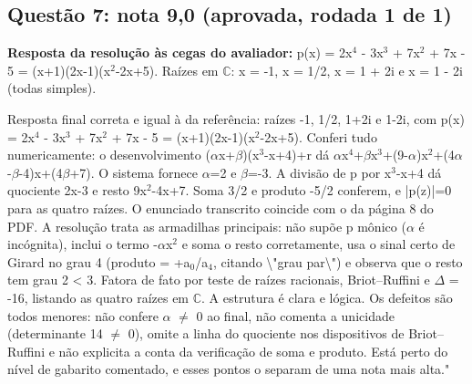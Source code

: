 \documentclass{article}%
\begin{document}
\subsection*{Questão 7: nota 9,0 (aprovada, rodada 1 de 1)}%
\textbf{Resposta da resolução às cegas do avaliador:} p(x) = 2x$^{4}$ - 3x$^3$ + 7x$^2$ + 7x - 5 = (x+1)(2x-1)(x$^2$-2x+5). Raízes em $\mathbb{C}$: x = -1, x = 1/2, x = 1 + 2i e x = 1 - 2i (todas simples).\par %
Resposta final correta e igual à da referência: raízes -1, 1/2, 1+2i e 1-2i, com p(x) = 2x$^{4}$ - 3x$^3$ + 7x$^2$ + 7x - 5 = (x+1)(2x-1)(x$^2$-2x+5). Conferi tudo numericamente: o desenvolvimento ($\alpha$x+$\beta$)(x$^3$-x+4)+r dá $\alpha$x$^{4}$+$\beta$x$^3$+(9-$\alpha$)x$^2$+(4$\alpha$-$\beta$-4)x+(4$\beta$+7). O sistema fornece $\alpha$=2 e $\beta$=-3. A divisão de p por x$^3$-x+4 dá quociente 2x-3 e resto 9x$^2$-4x+7. Soma 3/2 e produto -5/2 conferem, e |p(z)|=0 para as quatro raízes. O enunciado transcrito coincide com o da página 8 do PDF. A resolução trata as armadilhas principais: não supõe p mônico ($\alpha$ é incógnita), inclui o termo -$\alpha$x$^2$ e soma o resto corretamente, usa o sinal certo de Girard no grau 4 (produto = +a$_{0}$/a$_{4}$, citando \textbackslash{}"grau par\textbackslash{}") e observa que o resto tem grau 2 < 3. Fatora de fato por teste de raízes racionais, Briot--Ruffini e $\Delta$ = -16, listando as quatro raízes em $\mathbb{C}$. A estrutura é clara e lógica. Os defeitos são todos menores: não confere $\alpha$ $\neq$ 0 ao final, não comenta a unicidade (determinante 14 $\neq$ 0), omite a linha do quociente nos dispositivos de Briot--Ruffini e não explicita a conta da verificação de soma e produto. Está perto do nível de gabarito comentado, e esses pontos o separam de uma nota mais alta."%
\end{document}
